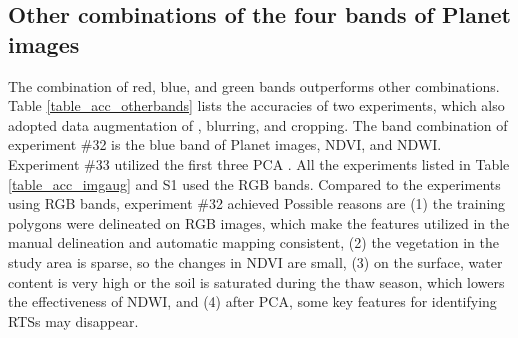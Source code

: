 \documentclass[authoryear,preprint,review,12pt]{elsarticle}
\begin{document}
\subsection{Other combinations of the four bands of Planet images}
\label{subsec_otherbands}

The combination of red, blue, and green bands outperforms other combinations.
Table \ref{table_acc_otherbands} lists the accuracies of two experiments, which also adopted data augmentation of , blurring, and cropping. The band combination of experiment \#32 is the blue band of Planet images, NDVI, and NDWI. Experiment \#33 utilized the first three PCA . All the experiments listed in Table \ref{table_acc_imgaug} and S1 used the RGB bands. Compared to the experiments using RGB bands, experiment \#32  achieved   Possible reasons are (1) the training polygons were delineated on RGB images, which make the features utilized in the manual delineation and automatic mapping consistent, (2) the vegetation in the study area is sparse, so the changes in NDVI are small, (3) on the surface, water content is very high or the soil is saturated during the thaw season, which lowers the effectiveness of NDWI, and (4) after PCA, some key features for identifying RTSs may disappear. 
\end{document}

